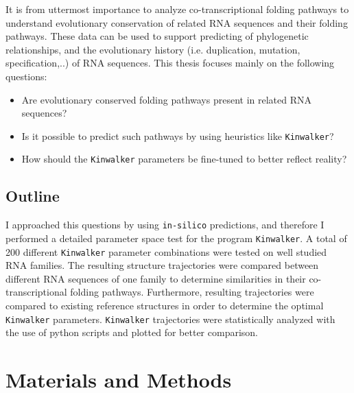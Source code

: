 \documentclass[ twoside,openright,titlepage,numbers=noenddot,headinclude,%
                footinclude=false, cleardoublepage=empty,abstractoff, %
                BCOR=5mm,paper=a4,fontsize=11pt,%
                ngerman,american,%
                ]{scrreprt}
\begin{document}
It is from uttermost importance to analyze co-transcriptional folding pathways to understand evolutionary conservation of related RNA sequences and their folding pathways. These data can be used to support predicting of phylogenetic relationships, and the evolutionary history (i.e. duplication, mutation, specification,..) of RNA sequences. This thesis focuses mainly on the following questions:

\begin{itemize}
\item Are evolutionary conserved folding pathways present in related RNA sequences?
\item Is it possible to predict such pathways by using heuristics like \texttt{Kinwalker}?
\item How should the \texttt{Kinwalker} parameters be fine-tuned to better reflect reality?
\end{itemize}



\section{Outline}
I approached this questions by using \texttt{in-silico} predictions, and therefore I performed a detailed parameter space test for the program \texttt{Kinwalker}.
A total of 200 different \texttt{Kinwalker} parameter combinations were
tested on well studied RNA families.
The resulting structure trajectories were compared between different RNA
sequences of one family to determine similarities in their
co-transcriptional folding pathways. Furthermore, resulting trajectories
were compared to existing reference structures in order to determine the
optimal \texttt{Kinwalker} parameters.
\texttt{Kinwalker} trajectories were statistically analyzed with the use of python scripts and plotted for better comparison. 





\chapter{Materials and Methods}
\end{document}
